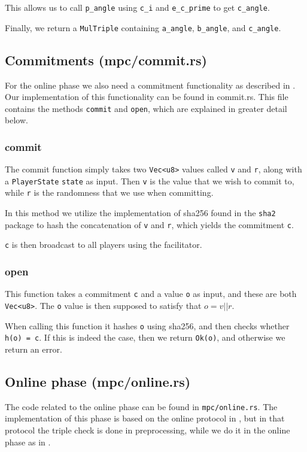 \documentclass[../main.tex]{subfiles}
\begin{document}
This allows us to call \lstinline{p_angle} using \lstinline{c_i} and \lstinline{e_c_prime} to get \lstinline{c_angle}.

Finally, we return a \lstinline{MulTriple} containing \lstinline{a_angle}, \lstinline{b_angle}, and \lstinline{c_angle}.

\subsection{Commitments (mpc/commit.rs)}
For the online phase we also need a commitment functionality as described in \cite{damgaard2013practical}.
Our implementation of this functionality can be found in commit.rs. This file contains the methods \lstinline{commit} and \lstinline{open}, which are explained in greater detail below.

\subsubsection{commit}
The commit function simply takes two \lstinline{Vec<u8>} values called \lstinline{v} and \lstinline{r}, along with a \lstinline{PlayerState} \lstinline{state} as input. Then \lstinline{v} is the value that we wish to commit to, while \lstinline{r} is the randomness that we use when committing.

In this method we utilize the implementation of sha256 found in the \lstinline{sha2} package to hash the concatenation of \lstinline{v} and \lstinline{r}, which yields the commitment \lstinline{c}.

\lstinline{c} is then broadcast to all players using the facilitator.

\subsubsection{open}
This function takes a commitment \lstinline{c} and a value \lstinline{o} as input, and these are both \lstinline{Vec<u8>}. The \lstinline{o} value is then supposed to satisfy that $o = v || r$.

When calling this function it hashes \lstinline{o} using sha256, and then checks whether \lstinline{h(o) = c}. If this is indeed the case, then we return \lstinline{Ok(o)}, and otherwise we return an error.

\subsection{Online phase (mpc/online.rs)}
The code related to the online phase can be found in \lstinline{mpc/online.rs}. The implementation of this phase is based on the online protocol in \cite{damgaard2013practical}, but in that protocol the triple check is done in preprocessing, while we do it in the online phase as in \cite{damgaard2012multiparty}.
\end{document}
